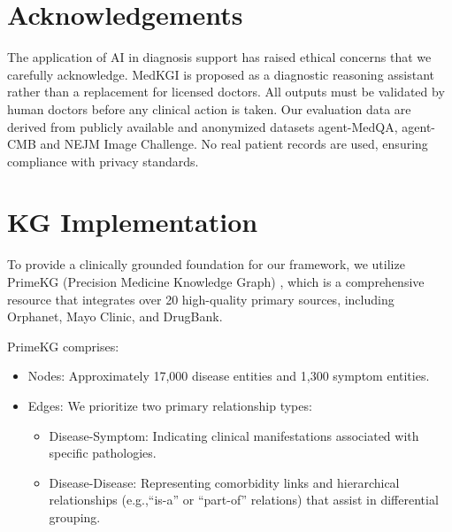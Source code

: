 \documentclass[11pt]{article}
\newcommand{\eg}{e.g.,\xspace}
\newcommand{\tool}{MedKGI{\xspace}}
\begin{document}
\section*{Acknowledgements}

The application of AI in diagnosis support has raised ethical concerns that we carefully acknowledge.
\tool{} is proposed as a diagnostic reasoning assistant rather than a replacement for licensed doctors. All outputs must be validated by human doctors before any clinical action is taken.
Our evaluation data are derived from publicly available and anonymized datasets agent-MedQA, agent-CMB and NEJM Image Challenge. No real patient records are used, ensuring compliance with privacy standards.



\clearpage
\appendix

\section{KG Implementation}
\label{kg}

To provide a clinically grounded foundation for our framework, we utilize PrimeKG (Precision Medicine Knowledge Graph) \cite{primekg2023}, which is a comprehensive resource that integrates over 20 high-quality primary sources, including Orphanet, Mayo Clinic, and DrugBank. 

PrimeKG comprises:

\begin{itemize}
	\item Nodes: Approximately 17,000 disease entities and 1,300 symptom entities.
	\item Edges: We prioritize two primary relationship types:
	\begin{itemize}
		\item Disease-Symptom: Indicating clinical manifestations associated with specific pathologies.
		\item Disease-Disease: Representing comorbidity links and hierarchical relationships (\eg ``is-a'' or ``part-of'' relations) that assist in differential grouping.
	\end{itemize}
\end{itemize}
\end{document}
